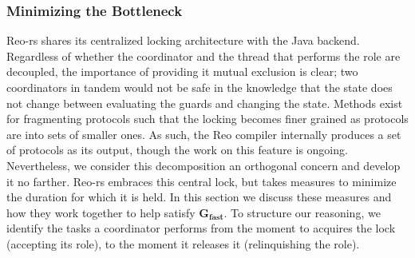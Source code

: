 \subsubsection{Minimizing the Bottleneck}
\label{sec:minimizing_the_bottleneck}
Reo-rs shares its centralized locking architecture with the Java backend. Regardless of whether the coordinator and the thread that performs the role are decoupled, the importance of providing it mutual exclusion is clear; two coordinators in tandem would not be safe in the knowledge that the state does not change between evaluating the guards and changing the state. Methods exist for fragmenting protocols such that the locking becomes finer grained as protocols are into sets of smaller ones. As such, the Reo compiler internally produces a set of protocols as its output, though the work on this feature is ongoing. Nevertheless, we consider this decomposition an orthogonal concern and develop it no farther. Reo-rs embraces this central lock, but takes measures to minimize the duration for which it is held. In this section we discuss these measures and how they work together to help satisfy $\boldsymbol{G_{fast}}$. To structure our reasoning, we identify the tasks a coordinator performs from the moment to acquires the lock (accepting its role), to the moment it releases it (relinquishing the role). 

